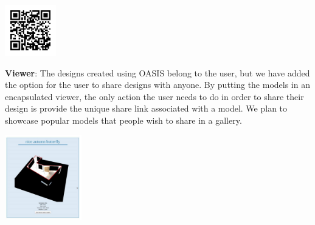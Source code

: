 \documentclass[landscape,final,a0paper,fontscale=0.285]{baposter}
\begin{document}
\begin{poster}
{\begin{multicols}{2}
	 \begin{center}\includegraphics[height=6em]{img/videoqr.jpg}	
	  \end{center}	
	\textbf{Viewer}:  The designs created using OASIS belong to the user, but we have added the option for the user to share designs with anyone. By putting the models in an encapsulated viewer, the only action the user needs to do in order to share their design is provide the unique share link associated with a model. We plan to showcase popular models that people wish to share in a gallery. 
	
	\begin{center}\includegraphics[height=10em]{img/nab.png}	
	\end{center}	
	
	
	
	   
 \end{multicols}
}


\end{poster}
\end{document}
